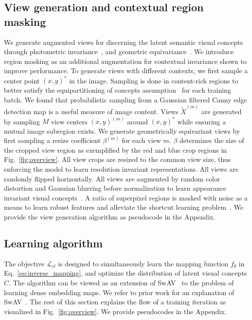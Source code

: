 \documentclass{bmvc2k}
\begin{document}
\subsection{View generation and contextual region masking}
\label{sec:view_generation}
We generate augmented views for discerning the latent semantic visual concepts through photometric invariance~\cite{Chen2020SimCLR}, and geometric equivariance~\cite{Cho2021PiCIE}. We introduce region masking as an additional augmentation for contextual invariance shown to improve performance.
To generate views with different contexts, we first sample a center point $(x, y)^*$ in the image. Sampling is done in content-rich regions to better satisfy the equipartitioning of concepts assumption~\cite{Asano2020SeLA, Caron2020SwAV} for each training batch. We found that probabilistic sampling from a Gaussian filtered Canny edge detection map\cite{Canny1986CannyEdge} is a useful measure of image content. Views $\tilde{X}^{(m)}$ are generated by sampling $M$ view centers $(x, y)^{(m)}$ around $(x, y)^*$ while ensuring a mutual image subregion exists.
We generate geometrically equivariant views by first sampling a resize coefficient $\beta^{(m)}$ for each view $m$. $\beta$ determines the size of the cropped view region as exemplified by the red and blue crop regions in Fig.~\ref{fig:overview}. All view crops are resized to the common view size, thus enforcing the model to learn resolution invariant representations. All views are randomly flipped horizontally.
All views are augmented by random color distortion and Gaussian blurring before normalization to learn appearance invariant visual concepts~\cite{Chen2020SimCLR, Xiao2021WhatShouldNot, Wen2021TowardUnderstanding}. A ratio of superpixel regions is masked with noise as a means to learn robust features and alleviate the shortcut learning problem~\cite{Geirhos2020ShortcutLearning}. We provide the view generation algorithm as pseudocode in the Appendix.

\subsection{Learning algorithm}

The objective $\mathcal{L}_{cl}$ is designed to simultaneously learn the mapping function $f_\theta$ in Eq.~\ref{eq:inverse_mapping}, and optimize the distribution of latent visual concepts $C$. The algorithm can be viewed as an extension of SwAV~\cite{Caron2020SwAV} to the problem of learning dense embedding maps. We refer to prior work for an explanation of SwAV~\cite{Caron2020SwAV, Asano2020SeLA, Cuturi2013OptimalTransport, Kaiser2021UnderstandingSwAV}. The rest of this section explains the flow of a training iteration as visualized in Fig.~\ref{fig:overview}. We provide pseudocodes in the Appendix.
\end{document}
